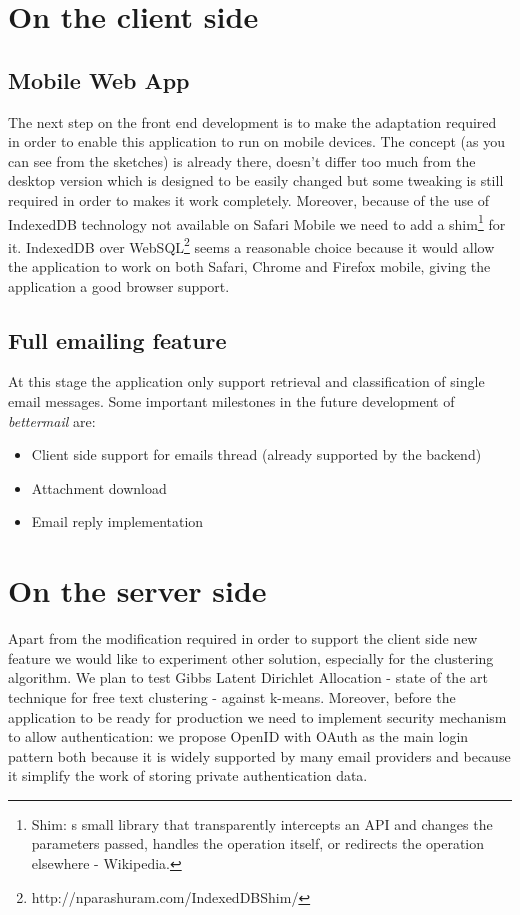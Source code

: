 \documentclass[a4paper,12pt]{report}
\begin{document}
\section{On the client side}
\subsection{Mobile Web App} %
\label{sub:mobile_web_app}


The next step on the front end development is to make the adaptation required in order to enable this application to run on mobile devices. The concept (as you can see from the sketches) is already there, doesn't differ too much from the desktop version which is designed to be easily changed but some tweaking is still required in order to makes it work completely.
Moreover, because of the use of IndexedDB technology not available on Safari Mobile we need to add a shim\footnote{Shim: s small library that transparently intercepts an API and changes the parameters passed, handles the operation itself, or redirects the operation elsewhere - Wikipedia.} for it. IndexedDB over WebSQL\footnote{http://nparashuram.com/IndexedDBShim/} seems a reasonable choice because it would allow the application to work on both Safari, Chrome and Firefox mobile, giving the application a good browser support.
\subsection{Full emailing feature} %
\label{sub:full_emailing_feature}
At this stage the application only support retrieval and classification of single email messages. Some important milestones in the future development of \emph{bettermail} are:
\begin{itemize}
  \item Client side support for emails thread (already supported by the backend)
  \item Attachment download
  \item Email reply implementation 
\end{itemize}

\section{On the server side}

Apart from the modification required in order to support the client side new feature we would like to experiment other solution, especially for the clustering algorithm. We plan to test Gibbs Latent Dirichlet Allocation - state of the art technique for free text clustering - against k-means. 
Moreover, before the application to be ready for production we need to implement security mechanism to allow authentication: we propose OpenID with OAuth as the main login pattern both because it is widely supported by many email providers and because it simplify the work of storing private authentication data.
\end{document}
